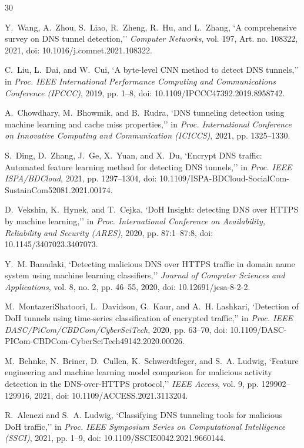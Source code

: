\documentclass[conference]{IEEEtran}
\begin{document}
\balance
\begin{thebibliography}{30}

Y.~Wang, A.~Zhou, S.~Liao, R.~Zheng, R.~Hu, and L.~Zhang, `A comprehensive survey on DNS tunnel detection,'' \emph{Computer Networks}, vol. 197, Art. no. 108322, 2021, doi: 10.1016/j.comnet.2021.108322.

C.~Liu, L.~Dai, and W.~Cui, `A byte-level CNN method to detect DNS tunnels,'' in \emph{Proc. IEEE International Performance Computing and Communications Conference (IPCCC)}, 2019, pp. 1--8, doi: 10.1109/IPCCC47392.2019.8958742.

A.~Chowdhary, M.~Bhowmik, and B.~Rudra, `DNS tunneling detection using machine learning and cache miss properties,'' in \emph{Proc. International Conference on Innovative Computing and Communication (ICICCS)}, 2021, pp. 1325--1330.

S.~Ding, D.~Zhang, J.~Ge, X.~Yuan, and X.~Du, `Encrypt DNS traffic: Automated feature learning method for detecting DNS tunnels,'' in \emph{Proc. IEEE ISPA/BDCloud}, 2021, pp. 1297--1304, doi: 10.1109/ISPA-BDCloud-SocialCom-SustainCom52081.2021.00174.

D.~Vekshin, K.~Hynek, and T.~Cejka, `DoH Insight: detecting DNS over HTTPS by machine learning,'' in \emph{Proc. International Conference on Availability, Reliability and Security (ARES)}, 2020, pp. 87:1--87:8, doi: 10.1145/3407023.3407073.

Y.~M. Banadaki, `Detecting malicious DNS over HTTPS traffic in domain name system using machine learning classifiers,'' \emph{Journal of Computer Sciences and Applications}, vol. 8, no. 2, pp. 46--55, 2020, doi: 10.12691/jcsa-8-2-2.

M.~MontazeriShatoori, L.~Davidson, G.~Kaur, and A.~H. Lashkari, `Detection of DoH tunnels using time-series classification of encrypted traffic,'' in \emph{Proc. IEEE DASC/PiCom/CBDCom/CyberSciTech}, 2020, pp. 63--70, doi: 10.1109/DASC-PICom-CBDCom-CyberSciTech49142.2020.00026.

M.~Behnke, N.~Briner, D.~Cullen, K.~Schwerdtfeger, and S.~A. Ludwig, `Feature engineering and machine learning model comparison for malicious activity detection in the DNS-over-HTTPS protocol,'' \emph{IEEE Access}, vol. 9, pp. 129902--129916, 2021, doi: 10.1109/ACCESS.2021.3113204.

R.~Alenezi and S.~A. Ludwig, `Classifying DNS tunneling tools for malicious DoH traffic,'' in \emph{Proc. IEEE Symposium Series on Computational Intelligence (SSCI)}, 2021, pp. 1--9, doi: 10.1109/SSCI50042.2021.9660144.


\end{thebibliography}
\end{document}
